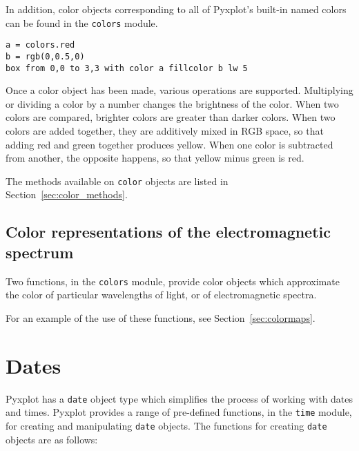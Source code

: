 \noindent In addition, color objects corresponding to all of Pyxplot's built-in
named colors can be found in the {\tt colors} module.

\begin{verbatim}
a = colors.red
b = rgb(0,0.5,0)
box from 0,0 to 3,3 with color a fillcolor b lw 5
\end{verbatim}

Once a color object has been made, various operations are supported.
Multiplying or dividing a color by a number changes the brightness of the
color. When two colors are compared, brighter colors are greater than darker
colors. When two colors are added together, they are additively mixed in RGB
space, so that adding red and green together produces yellow. When one color is
subtracted from another, the opposite happens, so that yellow minus green is
red.

\noindent The methods available on {\tt color} objects are listed in
Section~\ref{sec:color_methods}.

\subsection{Color representations of the electromagnetic spectrum}

Two functions, in the {\tt colors} module, provide color objects which
approximate the color of particular wavelengths of light, or of electromagnetic
spectra.


\noindent For an example of the use of these functions, see
Section~\ref{sec:colormaps}.

\section{Dates}

Pyxplot has a {\tt date} object type which simplifies the process of working
with dates and times.  Pyxplot provides a range of pre-defined functions, in
the {\tt time} module, for creating and manipulating {\tt date} objects. The
functions for creating {\tt date} objects are as follows:

